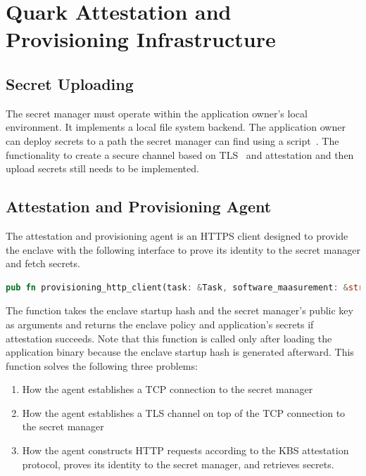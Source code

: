 \section{Quark Attestation and Provisioning Infrastructure}
\label{sec:impl_attestation_infr}

\subsection{Secret Uploading}
The secret manager must operate within the application owner's local environment. It implements a local file system backend. The application owner can deploy secrets to a path the secret manager can find using a script~\cite*{secret_uploading_script}. The functionality to create a secure channel 
based on TLS~\cite*{tls_record_size} and attestation and then upload secrets still needs to be implemented.

\subsection{Attestation and Provisioning Agent}
The attestation and provisioning agent is an HTTPS client designed to provide the enclave with the following interface to prove its identity to the secret manager and fetch secrets.

\begin{lstlisting}[language=rust, caption= API of the atestation and provisioning agent]
    pub fn provisioning_http_client(task: &Task, software_maasurement: &str, sm_cert: Vec<u8>) -> Result<(KbsPolicy, KbsSecrets)>
\end{lstlisting}

The function takes the enclave startup hash and the secret manager’s public key as arguments and returns the enclave policy and application’s secrets if attestation succeeds. Note that this function is called only after loading the application binary because the enclave startup hash is 
generated afterward. This function solves the following three problems:

\begin{enumerate}
    \item How the agent establishes a TCP connection to the secret manager
    \item How the agent establishes a TLS channel on top of the TCP connection to the secret manager
    \item How the agent constructs HTTP requests according to the KBS attestation protocol, proves its identity to the secret manager, and retrieves secrets.
\end{enumerate}

